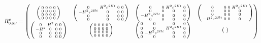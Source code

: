 \documentclass{article}
\begin{document}
		$$ 
			R^{\rho}_{\sigma\mu\nu} = \begin{pmatrix}
				\begin{psmallmatrix}
					0 & 0 & 0 & 0 \\
					0 & 0 & 0 & 0 \\
					0 & 0 & 0 & 0 \\
					0 & 0 & 0 & 0
				\end{psmallmatrix} & 
				\begin{psmallmatrix}
					0 & H^2 e^{2Ht} & 0 & 0 \\
					-H^2 e^{2Ht} & 0 & 0 & 0 \\
					0 & 0 & 0 & 0 \\
					0 & 0 & 0 & 0
				\end{psmallmatrix} &
				\begin{psmallmatrix}
					0 & 0 & H^2 e^{2Ht} & 0 \\
					0 & 0 & 0 & 0 \\
					-H^2 e^{2Ht} & 0 & 0 & 0 \\
					0 & 0 & 0 & 0
				\end{psmallmatrix} &
				\begin{psmallmatrix}
					0 & 0 & 0 & H^2 e^{2Ht} \\
					0 & 0 & 0 & 0 \\
					0 & 0 & 0 & 0 \\
					-H^2 e^{2Ht} & 0 & 0 & 0
				\end{psmallmatrix} \\
				\begin{psmallmatrix}
					0 & H^2 & 0 & 0 \\
					-H^2 & 0 & 0 & 0 \\
					0 & 0 & 0 & 0 \\
					0 & 0 & 0 & 0
				\end{psmallmatrix} & 
				\begin{psmallmatrix}
					0 & 0 & 0 & 0 \\
					0 & 0 & 0 & 0 \\
					0 & 0 & 0 & 0 \\
					0 & 0 & 0 & 0
				\end{psmallmatrix} &
				\begin{psmallmatrix}
					0 & 0 & 0 & 0 \\
					0 & 0 & H^2 e^{2Ht} & 0 \\
					0 & -H^2 e^{2Ht} & 0 & 0 \\
					0 & 0 & 0 & 0
				\end{psmallmatrix} &
				\begin{psmallmatrix}

\end{psmallmatrix}
\end{pmatrix}$$
\end{document}
